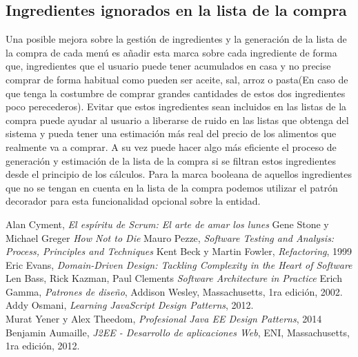 \documentclass[12pt, a4paper, twoside]{book}
\begin{document}
	\subsection{Ingredientes ignorados en la lista de la compra}
	Una posible mejora sobre la gestión de ingredientes y la generación de la lista de la compra de cada menú es añadir esta marca sobre cada ingrediente de forma que, ingredientes que el usuario puede tener acumulados en casa y no precise comprar de forma habitual como pueden ser aceite, sal, arroz o pasta(En caso de que tenga la costumbre de comprar grandes cantidades de estos dos ingredientes poco perecederos).
	Evitar que estos ingredientes sean incluidos en las listas de la compra puede ayudar al usuario a liberarse de ruido en las listas que obtenga del sistema y pueda tener una estimación más real del precio de los alimentos que realmente va a comprar. A su vez puede hacer algo más eficiente el proceso de generación y estimación de la lista de la compra si se filtran estos ingredientes desde el principio de los cálculos.
	Para la marca booleana de aquellos ingredientes que no se tengan en cuenta en la lista de la compra podemos utilizar el patrón decorador para esta funcionalidad opcional sobre la entidad.
	\begin{thebibliography}{99}
		Alan Cyment,
		\emph{El espíritu de Scrum: El arte de amar los lunes}
		Gene Stone y Michael Greger
		\emph{How Not to Die}
		Mauro Pezze,
		\emph{Software Testing and Analysis: Process, Principles and Techniques}
		Kent Beck y Martin Fowler,
		\emph{Refactoring},
		1999
		Eric Evans,
		\emph{Domain-Driven Design: Tackling Complexity in the Heart of Software}
		Len Bass, Rick Kazman, Paul Clements
		\emph{Software Architecture in Practice}
		Erich Gamma,
		\emph{Patrones de diseño},
		Addison Wesley, Massachusetts,
		1ra edición,
		2002.\\
		Addy Osmani,
		\emph{Learning JavaScript Design Patterns},
		2012.\\
		Murat Yener y Alex Theedom,
		\emph{Profesional Java EE Design Patterns},
		2014
		Benjamin Aumaille,
		\emph{J2EE - Desarrollo de aplicaciones Web},
		ENI, Massachusetts,
		1ra edición,
		2012.
	\end{thebibliography}
	\renewcommand{\bibname}{Enlaces de interés}
\end{document}
